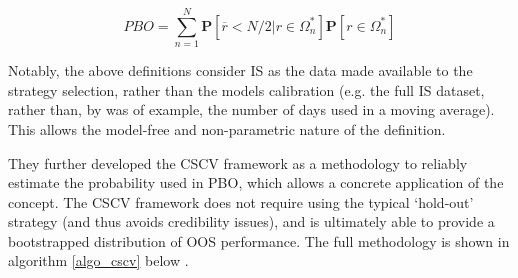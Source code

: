\documentclass[a4paper,11pt,oneside]{article}
\theoremstyle{plain}
\theoremstyle{definition}
\begin{document}
\begin{equation}\label{eq:PBO2}
PBO = \sum_{n=1}^{N}\mathbf{P}[\overline{r} < {N/2}|r\in\Omega_{n}^{*}]\mathbf{P}[r\in\Omega_{n}^{*}]
\end{equation}

Notably, the above definitions consider IS as the data made available to the strategy selection, rather than the 
models calibration (e.g. the full IS dataset, rather than, by was of example, the number of days used in a moving average). 
This allows the model-free and non-parametric nature of the definition. 
\hfill \break 

They further developed the CSCV framework as a methodology to reliably estimate the probability used in PBO, which allows a concrete application of the concept. The CSCV framework does not require using the typical ‘hold-out’ strategy (and thus avoids credibility issues), and is ultimately able to provide a bootstrapped distribution of OOS performance. The full methodology is shown in algorithm \ref{algo_cscv} below \cite{BailyPBO}.
\hfill \break 
\end{document}
